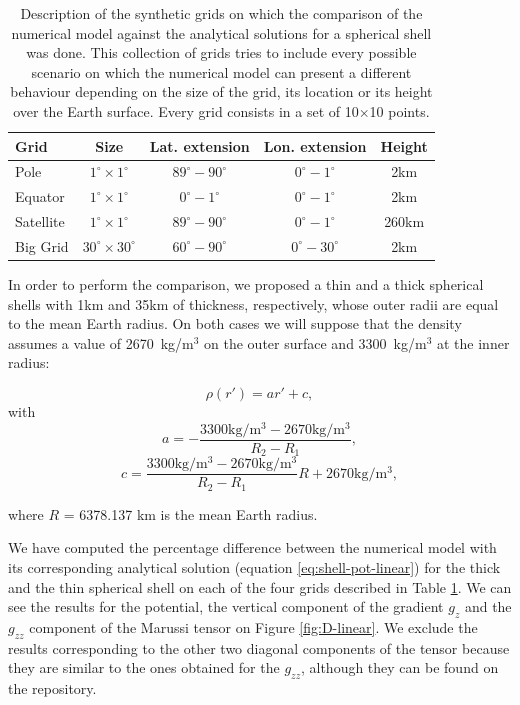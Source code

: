 \documentclass[extra]{gji}
\begin{document}
\begin{table}
\caption{
    Description of the synthetic grids on which the comparison of the
    numerical model against the analytical solutions for a spherical
    shell was done.
    This collection of grids tries to include every possible scenario
    on which the numerical model can present a different behaviour
    depending on the size of the grid, its location or its height over
    the Earth surface. Every grid consists in a set of 10$\times$10
    points.
}
\label{tab:grids}
\begin{tabular}{lcccc}
    Grid & Size & Lat. extension & Lon. extension & Height \\ \hline
    Pole & $1^\circ \times 1^\circ$ & $89^\circ - 90^\circ$ &
        $0^\circ - 1^\circ$ & 2km \\
    Equator & $1^\circ \times 1^\circ$ & $0^\circ - 1^\circ$ &
        $0^\circ - 1^\circ$ & 2km \\
    Satellite & $1^\circ \times 1^\circ$ & $89^\circ - 90^\circ$ &
        $0^\circ - 1^\circ$ & 260km \\
    Big Grid & $30^\circ \times 30^\circ$ & $60^\circ - 90^\circ$ &
        $0^\circ - 30^\circ$ & 2km \\
\end{tabular}
\end{table}

In order to perform the comparison, we proposed a thin and a thick
spherical shells with 1km and 35km of thickness, respectively, whose
outer radii are equal to the mean Earth radius.
On both cases we will suppose that the density assumes a value of
2670~kg/m$^3$ on the outer surface and 3300~kg/m$^3$ at the inner
radius:

\begin{equation}
    \rho(r') = ar' + c,
    \label{eq:density-linear}
\end{equation}
\noindent with
\begin{equation}
    a = -\frac{3300\text{kg/m$^3$} - 2670\text{kg/m$^3$}}{R_2 - R_1},
\end{equation}
\begin{equation}
    c = \frac{3300\text{kg/m$^3$} -
        2670\text{kg/m$^3$}}{R_2 - R_1} R +
        2670\text{kg/m$^3$},
\end{equation}

\noindent where $R$ = 6378.137 km is the mean Earth radius.

We have computed the percentage difference between the numerical model
with its corresponding analytical solution (equation
\ref{eq:shell-pot-linear}) for the thick and the thin spherical shell
on each of the four grids described in Table \ref{tab:grids}.
We can see the results for the potential, the vertical component of the
gradient $g_z$ and the $g_{zz}$ component of the Marussi tensor on
Figure \ref{fig:D-linear}.
We exclude the results corresponding to the other two diagonal
components of the tensor because they are similar to the ones obtained
for the $g_{zz}$, although they can be found on the repository.
\end{document}
